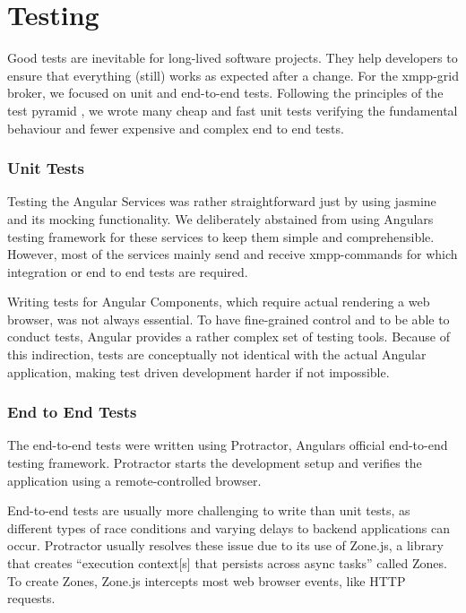 \section{Testing}\label{sec:testing}

Good tests are inevitable for long-lived software projects.
They help developers to ensure that everything (still) works as expected after a change.
For the \gls{xmpp-grid} \gls{broker}, we focused on unit and end-to-end tests.
Following the principles of the test pyramid \cite{Cohn:2009:SAS:1667109}, we wrote many cheap and fast unit tests verifying the fundamental behaviour and fewer expensive and complex end to end tests.

\subsubsection{Unit Tests}

Testing the Angular Services was rather straightforward just by using jasmine and its mocking functionality.
We deliberately abstained from using Angulars testing framework for these services to keep them simple and comprehensible.
However, most of the services mainly send and receive \gls{xmpp}-commands for which integration or end to end tests are required.

Writing tests for Angular Components, which require actual rendering a web browser, was not always essential.
To have fine-grained control and to be able to conduct tests, Angular provides a rather complex set of testing tools.
Because of this indirection, tests are conceptually not identical with the actual Angular application, making test driven development harder if not impossible.

\subsubsection{End to End Tests}

The end-to-end tests were written using Protractor, Angulars official end-to-end testing framework.
Protractor starts the development setup and verifies the application using a remote-controlled browser.

End-to-end tests are usually more challenging to write than unit tests, as different types of race conditions and varying delays to backend applications can occur.
Protractor usually resolves these issue due to its use of Zone.js, a library that creates ``execution context[s] that persists across async tasks'' called Zones.
To create Zones, Zone.js intercepts most web browser events, like HTTP requests.~\cite{zone-js-readme}

